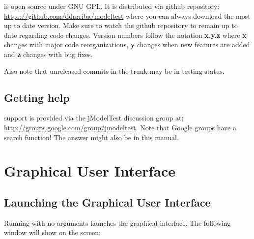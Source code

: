 \documentclass[10pt,twoside,a4paper]{article}
\begin{document}
\modeltest is open source under GNU GPL. 
It is distributed via github repository:
\url{https://github.com/ddarriba/modeltest} where you can always download the most up to date version. 
Make sure to watch the github repository to remain up to date regarding code changes.
Version numbers follow the notation {\bf x.y.z} where {\bf x} changes with major code reorganizations, {\bf y}
changes when new features are added and {\bf z} changes with bug fixes.

Also note that unreleased commits in the trunk may be in testing status.

\subsection{Getting help}

\modeltest support is provided via the jModelTest discussion group at: \url{http://groups.google.com/group/jmodeltest}.  Note that Google groups have a search function! The answer might also be in this manual.





{\footnotesize

}





\section{Graphical User Interface}
\label{sec:gui}

\subsection{Launching the Graphical User Interface}

Running {\modeltestguibin} with no arguments launches the graphical interface.
The following window will show on the screen:
\end{document}
